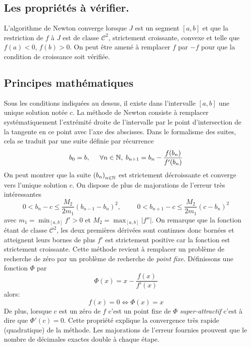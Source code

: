 \subsection{Les propriétés à vérifier.}
L'algorithme de Newton converge lorsque $J$ est un segment $[a,b]$ et que la restriction de $f$ à $J$ est de classe $\mathcal{C}^2$, strictement croissante, convexe et telle que $f(a)<0$, $f(b)>0$. On peut être amené à remplacer $f$ par $-f$ pour que la condition de croissance soit vérifiée. 

\subsection{Principes mathématiques}
Sous les conditions indiquées au dessus, il existe dans l'intervalle $[a,b]$ une unique solution notée $c$. La méthode de Newton consiste à remplacer systématiquement l'extrémité droite de l'intervalle par le point d'intersection de la tangente en ce point avec l'axe des abscisses. Dans le formalisme des suites, cela se traduit par une suite définie par récurrence
\begin{displaymath}
  b_0 = b,\hspace{0.5cm}\forall n\in\mathbb{N},\;b_{n+1} = b_n -\frac{f(b_n)}{f'(b_n)}
\end{displaymath}
On peut montrer que la suite $\left( b_n\right)_{n\in \mathbb{N}}$ est strictement décroissante et converge vers l'unique solution $c$. On dispose de plus de majorations de l'erreur très intéressantes
\begin{displaymath}
  0< b_n -c \leq \frac{M_2}{2m_1}(b_{n-1}-b_n)^2,\hspace{1cm} 0< b_{n+1} -c \leq \frac{M_2}{2m_1}(c-b_n)^2
\end{displaymath}
avec $m_1 = \min_{[a,b]} f'>0$ et $M_2 = \max_{[a,b]}\left|f''\right|$.\newline
On remarque que la fonction étant de classe $\mathcal{C}^2$, les deux premières dérivées sont continues donc bornées et atteignent leurs bornes de plus $f'$ est strictement positive car la fonction est strictement croissante.\newline
Cette méthode revient à remplacer un problème de recherche de zéro par un problème de recherche de \emph{point fixe}. Définissons une fonction $\Phi$ par
\begin{displaymath}
  \Phi(x) = x -\frac{f(x)}{f'(x)}
\end{displaymath}
alors:
\begin{displaymath}
  f(x) = 0 \Leftrightarrow \Phi(x) = x
\end{displaymath}
De plus, lorsque $c$ est un zéro de $f$ c'est un point fixe de $\Phi$ \emph{super-attractif} c'est à dire que $\Phi'(c)=0$. Cette propriété explique la convergence très rapide (quadratique) de la méthode. Les majorations de l'erreur fournies prouvent que le nombre de décimales exactes double à chaque étape.


